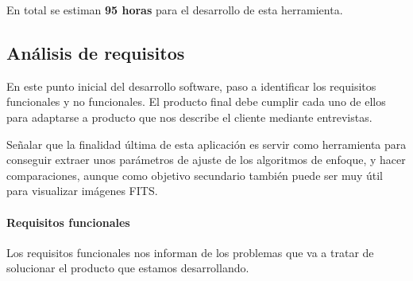 En total se estiman \textbf{95 horas} para el desarrollo de esta herramienta.   



\subsection{Análisis de requisitos}

En este punto inicial del desarrollo software, paso a identificar los requisitos funcionales y no funcionales. 
El producto final debe cumplir cada uno de ellos para adaptarse a producto que nos describe el cliente mediante entrevistas.


Señalar que la finalidad última de esta aplicación es servir como herramienta para conseguir extraer unos parámetros de ajuste de los algoritmos de enfoque, y hacer comparaciones, aunque como objetivo secundario también puede ser muy útil para visualizar imágenes FITS.


\paragraph{Requisitos funcionales}

Los requisitos funcionales nos informan de los problemas que va a tratar de solucionar el producto que estamos desarrollando.

